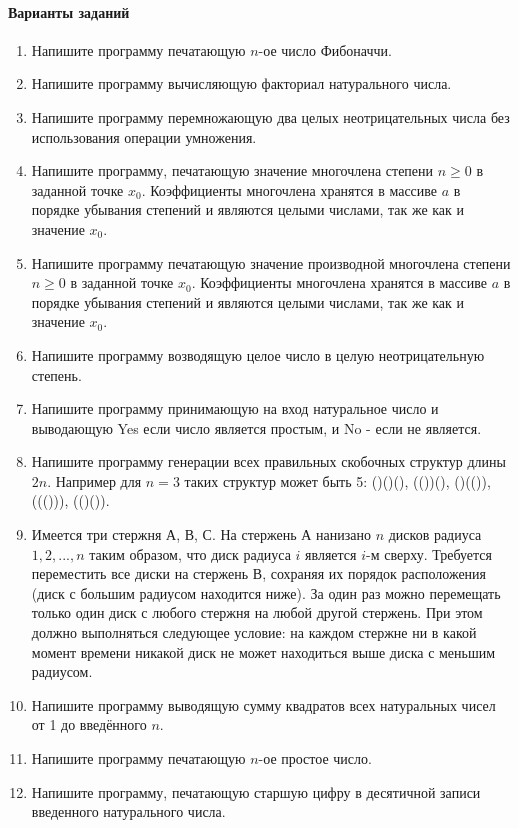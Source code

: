 \documentclass[a4paper,12pt]{article}
\begin{document}
\paragraph{Варианты заданий}
\begin{enumerate}
	\item Напишите программу печатающую $n$-ое число Фибоначчи.
	\item Напишите программу вычисляющую факториал натурального числа.
	\item Напишите программу перемножающую два целых неотрицательных числа без использования операции умножения.
	\item Напишите программу, печатающую значение многочлена степени $n\geq0$ в заданной точке $x_{0}$. Коэффициенты многочлена хранятся в массиве $a$ в порядке убывания степений и являются целыми числами, так же как и значение $x_{0}$.
	\item Напишите программу печатающую значение производной многочлена степени $n\geq0$ в заданной точке $x_{0}$. Коэффициенты многочлена хранятся в массиве $a$ в порядке убывания степений и являются целыми числами, так же как и значение $x_{0}$.
	\item Напишите программу возводящую целое число в целую неотрицательную степень.
	\item Напишите программу принимающую на вход натуральное число и выводающую Yes если число является простым, и No - если не является.
	\item Напишите программу генерации всех правильных скобочных структур длины $2n$. Например для $n=3$ таких структур может быть 5: ()()(), (())(), ()(()), ((())), (()()).
	\item Имеется три стержня А, В, С. На стержень А нанизано $n$ дисков радиуса $1, 2,..., n$ таким образом, что диск радиуса $i$ является $i$-м сверху. Требуется переместить все диски на стержень В, сохраняя их порядок расположения (диск с большим радиусом находится ниже). За один раз можно перемещать только один диск с любого стержня на любой другой стержень. При этом должно выполняться следующее условие: на каждом стержне ни в какой момент времени никакой диск не может находиться выше диска с меньшим радиусом. 
	\item Напишите программу выводящую сумму квадратов всех натуральных чисел от 1 до введённого $n$.
	\item Напишите программу печатающую $n$-ое простое число.
	\item Напишите программу, печатающую старшую цифру в десятичной записи введенного натурального числа.

\end{enumerate}
\end{document}
